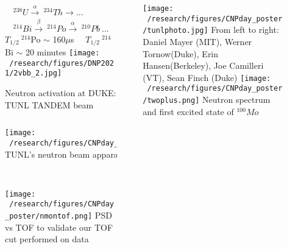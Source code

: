 \documentclass[final]{beamer}
\newlength{\sepwidth}
\newlength{\colwidth}
\newcommand{\separatorcolumn}{\begin{column}{\sepwidth}\end{column}}
\begin{document}
\begin{frame}[t]
\begin{columns}[t]
\begin{column}{\colwidth}
\end{column}

\separatorcolumn

\begin{column}{\colwidth}
      
      \begin{eqnarray*}
      ^{238}U \xrightarrow{\alpha} \  ^{234}Th \xrightarrow \  ... \\ ^{214}Bi \xrightarrow{\beta} \  ^{214}Po \xrightarrow{\alpha} \ ^{210}Pb \ ...
      \end{eqnarray*}
      $T_{1/2} \ ^{214}$Po $\sim$ 160$\mu$s \ \ $T_{1/2} \ ^{214}$Bi $\sim$ 20 minutes
    \texttt{[image: ~/research/figures/DNP2021/2vbb\_2.jpg]}
  
  \begin{block}{Neutron activation at DUKE: TUNL TANDEM beam}

  \vspace{2cm}
  \begin{columns}[c] %
      
      \column{.4\colwidth} %
      \texttt{[image: ~/research/figures/CNPday\_poster/TUNL.png]}
      {\footnotesize TUNL's neutron beam apparatus}    
      
      \column{.5\colwidth} %
      \texttt{[image: ~/research/figures/CNPday\_poster/8MeV\_TOF.png]}
      {\footnotesize Time of flight spectrum of events from TANDEM accelerator detected in HPGe} 
  \end{columns}


   \texttt{[image: ~/research/figures/CNPday\_poster/nmontof.png]}
      {\footnotesize PSD vs TOF to validate our TOF cut performed on data}


 
  \end{block}

  

  

\end{column}

\separatorcolumn

\begin{column}{\colwidth}
      \vspace{5cm}
      \texttt{[image: ~/research/figures/CNPday\_poster/tunlphoto.jpg]}
      {\footnotesize From left to right: Daniel Mayer (MIT), Werner Tornow(Duke), Erin Hansen(Berkeley), Joe Camilleri (VT), Sean Finch (Duke)}
      \texttt{[image: ~/research/figures/CNPday\_poster/twoplus.png]}
      {\footnotesize Neutron spectrum and first excited state of $^{100}Mo$}



\end{column}
\end{columns}
\end{frame}
\end{document}
